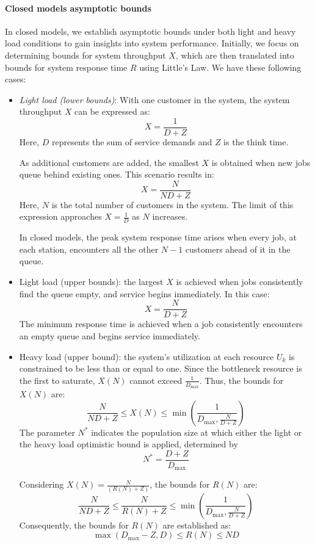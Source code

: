 \paragraph*{Closed models asymptotic bounds}
In closed models, we establish asymptotic bounds under both light and heavy load conditions to gain insights into system performance. 
Initially, we focus on determining bounds for system throughput $X$, which are then translated into bounds for system response time $R$ using Little's Law.
We have these following cases: 
\begin{itemize}
    \item \textit{Light load (lower bounds)}: With one customer in the system, the system throughput $X$ can be expressed as: 
        \[X=\dfrac{1}{D+Z}\]
        Here, $D$ represents the sum of service demands and $Z$ is the think time.

        As additional customers are added, the smallest $X$ is obtained when new jobs queue behind existing ones.
        This scenario results in: 
        \[X=\dfrac{N}{ND+Z}\]
        Here, $N$ is the total number of customers in the system.
        The limit of this expression approaches $X=\frac{1}{D}$ as $N$ increases.

        In closed models, the peak system response time arises when every job, at each station, encounters all the other $N-1$ customers ahead of it in the queue. 
    \item Light load (upper bounds): the largest $X$ is achieved when jobs consistently find the queue empty, and service begins immediately. 
        In this case: 
        \[X=\dfrac{N}{D+Z}\]
        The minimum response time is achieved when a job consistently encounters an empty queue and begins service immediately.
    \item Heavy load (upper bound): the system's utilization at each resource $U_k$ is constrained to be less than or equal to one. 
        Since the bottleneck resource is the first to saturate, $X(N)$ cannot exceed $\frac{1}{D_{\max}}$. 
        Thus, the bounds for $X(N)$ are: 
        \[\dfrac{N}{ND+Z}\leq X(N) \leq \min\left(\dfrac{1}{D_{\max},\frac{N}{D+Z}}\right)\]
        The parameter $N^\ast$ indicates the population size at which either the light or the heavy load optimistic bound is applied, determined by
        \[N^\ast=\dfrac{D+Z}{D_{\max}}\]

        Considering $X(N)=\frac{N}{(R(N)+Z)}$, the bounds for $R(N)$ are: 
        \[\dfrac{N}{ND+Z}\leq \dfrac{N}{R(N)+Z} \leq \min\left(\dfrac{1}{D_{\max},\frac{N}{D+Z}}\right)\]
        Consequently, the bounds for $R(N)$ are established as: 
        \[\max\left(D_{\max}-Z,D\right)\leq R(N) \leq ND\]
\end{itemize}


